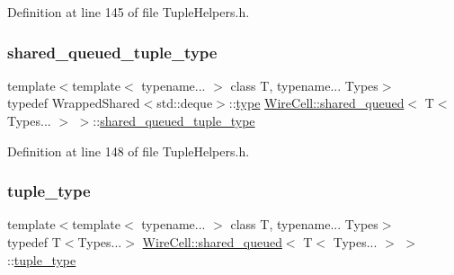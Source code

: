 Definition at line 145 of file Tuple\+Helpers.\+h.

\mbox{\label{struct_wire_cell_1_1shared__queued_3_01_t_3_01_types_8_8_8_01_4_01_4_ab8420ec9cbc02f0d73f0e7521a063cb0}} 
\subsubsection{\texorpdfstring{shared\+\_\+queued\+\_\+tuple\+\_\+type}{shared\_queued\_tuple\_type}}
{\footnotesize\ttfamily template$<$template$<$ typename... $>$ class T, typename... Types$>$ \\
typedef Wrapped\+Shared$<$std\+::deque$>$\+::\hyperlink{namespace_wire_cell_a1f69a2598e2cdb413ffac1157b50670a}{type} \hyperlink{struct_wire_cell_1_1shared__queued}{Wire\+Cell\+::shared\+\_\+queued}$<$ T$<$ Types... $>$ $>$\+::\hyperlink{struct_wire_cell_1_1shared__queued_3_01_t_3_01_types_8_8_8_01_4_01_4_ab8420ec9cbc02f0d73f0e7521a063cb0}{shared\+\_\+queued\+\_\+tuple\+\_\+type}}



Definition at line 148 of file Tuple\+Helpers.\+h.

\mbox{\label{struct_wire_cell_1_1shared__queued_3_01_t_3_01_types_8_8_8_01_4_01_4_a707744c73233f8c1ab8943ebd2c3e7e1}} 
\subsubsection{\texorpdfstring{tuple\+\_\+type}{tuple\_type}}
{\footnotesize\ttfamily template$<$template$<$ typename... $>$ class T, typename... Types$>$ \\
typedef T$<$Types...$>$ \hyperlink{struct_wire_cell_1_1shared__queued}{Wire\+Cell\+::shared\+\_\+queued}$<$ T$<$ Types... $>$ $>$\+::\hyperlink{struct_wire_cell_1_1shared__queued_3_01_t_3_01_types_8_8_8_01_4_01_4_a707744c73233f8c1ab8943ebd2c3e7e1}{tuple\+\_\+type}}



